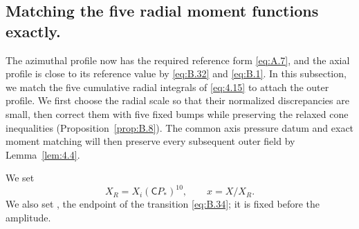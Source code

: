 \subsection{Matching the five radial moment functions exactly.}\label{sec:B.8}
The azimuthal profile  now has the required reference form \eqref{eq:A.7}, and the axial profile
 is close to its reference value  by \eqref{eq:B.32} and \eqref{eq:B.1}.
In this subsection, we match the five cumulative radial integrals
 of \eqref{eq:4.15} to attach the outer profile. We first choose the radial scale
 so that their normalized discrepancies are small, then correct them with five fixed bumps
while preserving the relaxed cone inequalities (Proposition~\ref{prop:B.8}). The common axis pressure datum
 and exact moment matching will then preserve every subsequent outer field by Lemma~\ref{lem:4.4}.

We set
\[
  X_R=X_i(\mathsf C P_*)^{10},
  \qquad
  x=X/X_R.
\]
We also set , the endpoint of the transition
\eqref{eq:B.34}; it is fixed before the amplitude.

